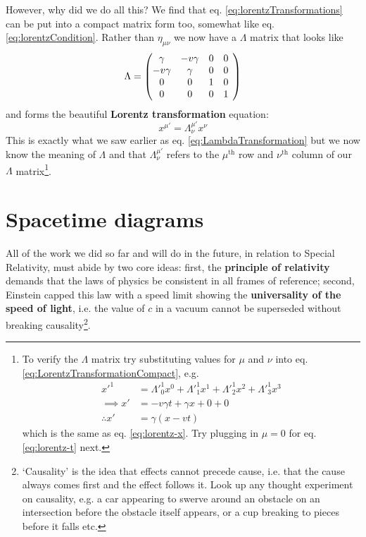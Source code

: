 \documentclass[english,seminar]{lecture}
\begin{document}
However, why did we do all this? We find that eq. \eqref{eq:lorentzTransformations} can be put into a compact matrix form too, somewhat like eq. \eqref{eq:lorentzCondition}. Rather than $\eta_{\mu\nu}$ we now have a $\Lambda$ matrix that looks like
\[
\Lambda = 
\begin{pmatrix}
	\gamma & -v\gamma & 0 & 0 \hspace*{0.15cm}\\
	-v\gamma & \gamma & 0 & 0 \hspace*{0.15cm}\\
	0 & 0 & 1 & 0 \hspace*{0.15cm}\\
	0 & 0 & 0 & 1 \hspace*{0.15cm}\\
\end{pmatrix}
\]
and forms the beautiful \textbf{Lorentz transformation} equation:
\begin{equation}
	x^{\mu '} = \Lambda^{\mu '}_\nu x^\nu \label{eq:LorentzTransformationCompact}
\end{equation}%
This is exactly what we saw earlier as eq. \eqref{eq:LambdaTransformation} but we now know the meaning of $\Lambda$ and that $\Lambda^{\mu '}_\nu$ refers to the $\mu^{\textrm{th}}$ row and $\nu^{\textrm{th}}$ column of our $\Lambda$ matrix\footnote{To verify the $\Lambda$ matrix try substituting values for $\mu$ and $\nu$ into eq. \eqref{eq:LorentzTransformationCompact}, e.g.%
\begin{align*}
	x'^{1} &= \Lambda'^{1}_{0} x^{0} + \Lambda'^{1}_{1} x^{1} + \Lambda'^{1}_{2} x^{2} + \Lambda'^{1}_{3} x^{3} \\
\implies x' &= -v\gamma t + \gamma x + 0 + 0 \\
\therefore x' &= \gamma (x - vt)
\end{align*}%
which is the same as eq. \eqref{eq:lorentz-x}. Try plugging in $\mu = 0$ for eq. \eqref{eq:lorentz-t} next.
}.

%
%
%
%
%
%
%

\section{Spacetime diagrams}\label{sec:spacetime-diagrams}

All of the work we did so far and will do in the future, in relation to Special Relativity, must abide by two core ideas: first, the \textbf{principle of relativity} demands that the laws of physics be consistent in all frames of reference; second, Einstein capped this law with a speed limit showing the \textbf{universality of the speed of light}, i.e. the value of $c$ in a vacuum cannot be superseded without breaking causality\footnote{`Causality' is the idea that effects cannot precede cause, i.e. that the cause always comes first and the effect follows it. Look up any thought experiment on causality, e.g. a car appearing to swerve around an obstacle on an intersection before the obstacle itself appears, or a cup breaking to pieces before it falls etc.}.
\end{document}
